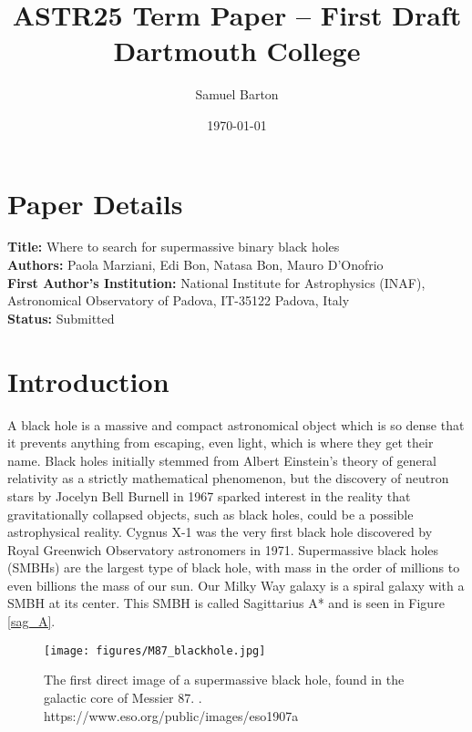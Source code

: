 \documentclass[12pt]{article}
\title{
{ASTR25 Term Paper -- First Draft}\\
{\large Dartmouth College}
}
\author{Samuel Barton}
\date{\today}
\begin{document}
\maketitle


\section{Paper Details}

{\large
\textbf{Title:} Where to search for supermassive binary black holes\supercite{marziani2025} \\
\textbf{Authors:} Paola Marziani, Edi Bon, Natasa Bon, Mauro D’Onofrio \\
\textbf{First Author’s Institution:} National Institute for Astrophysics (INAF), Astronomical Observatory of Padova, IT-35122 Padova, Italy \\
\textbf{Status:} Submitted
}

\section{Introduction}%

A black hole is a massive and compact astronomical object which is so dense that it prevents anything from escaping, even light, which is where they get their name. Black holes initially stemmed from Albert Einstein’s theory of general relativity as a strictly mathematical phenomenon, but the discovery of neutron stars by Jocelyn Bell Burnell in 1967 sparked interest in the reality that gravitationally collapsed objects, such as black holes, could be a possible astrophysical reality. Cygnus X-1 was the very first black hole discovered by Royal Greenwich Observatory astronomers in 1971.\supercite{Cygnus-X1} Supermassive black holes (SMBHs) are the largest type of black hole, with mass in the order of millions to even billions the mass of our sun. Our Milky Way galaxy is a spiral galaxy with a SMBH at its center. This SMBH is called Sagittarius A* and is seen in Figure \ref{sag_A}.


\begin{figure} [ht]
  \center
  \texttt{[image: figures/M87\_blackhole.jpg]}
  \caption{The first direct image of a supermassive black hole, found in the galactic core of Messier 87. {\supercite{black_hole_image}}. https://www.eso.org/public/images/eso1907a}
\end{figure}
\end{document}
